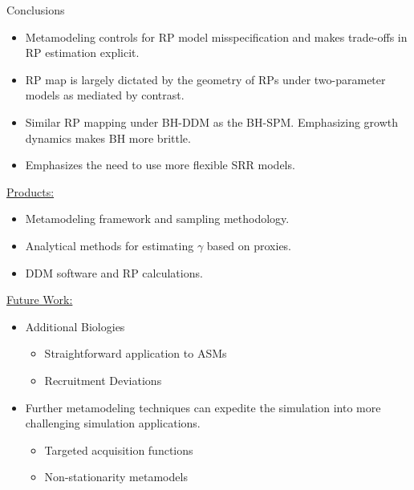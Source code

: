 \documentclass[ xcolor = pdftex, dvipsnames, table ]{beamer}
\begin{document}
%
\begin{frame}{Conclusions}
\begin{itemize}
\setlength\itemsep{1em}
\item Metamodeling controls for RP model misspecification and makes trade-offs in RP estimation explicit.
\item RP map is largely dictated by the geometry of RPs under two-parameter models as mediated by contrast.
\item Similar RP mapping under BH-DDM as the BH-SPM. Emphasizing growth dynamics makes BH more brittle.
\item Emphasizes the need to use more flexible SRR models. 
\end{itemize}
\end{frame}

%
\begin{frame}%
\underline{Products:}
\begin{itemize}
	\item Metamodeling framework and sampling methodology.
	\item Analytical methods for estimating $\gamma$ based on proxies.
	\item DDM software and RP calculations.
\end{itemize}
\underline{Future Work:}
\begin{itemize}
	\setlength\itemsep{1em}
	\item Additional Biologies
	\begin{itemize}
		\item Straightforward application to ASMs	
		\item Recruitment Deviations
	\end{itemize}
	\item Further metamodeling techniques can expedite the simulation 
		into more challenging simulation applications.
	\begin{itemize}
		\item Targeted acquisition functions 
		\item Non-stationarity metamodels
	\end{itemize}
\end{itemize}
\end{frame}
\end{document}
